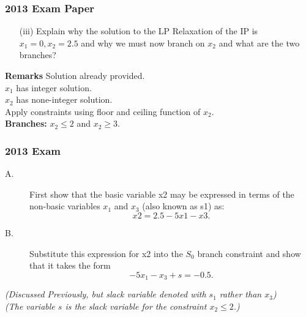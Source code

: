 \documentclass{beamer}
\begin{document}
\begin{frame}
\frametitle{2013 Exam Paper}
\large
\begin{itemize}
\item[(iii)] Explain why the solution to the LP Relaxation of the IP is $x_1 = 0, x_2 = 2.5$ and why we must now branch on $x_2$ and what are the
two branches? 
\end{itemize}
\bigskip
\noindent  \textbf{Remarks}
Solution already provided.\\
$x_1$ has integer solution.\\
$x_2$ has none-integer solution. \\ Apply constraints using floor and ceiling function of $x_2$.\\
\bigskip 
\textbf{Branches:}  $x_2 \leq 2$ and $x_2 \geq 3$.\\
\end{frame}

\begin{frame}
\frametitle{2013 Exam}
	\large
	\begin{description}
		\item[A.] First show that the basic variable x2 may be expressed in
		terms of the non-basic variables $x_1$ and $x_3$ (also known as s1) as:
		\[x2 = 2.5 - 5x1 - x3. \]
		\item[B.] Substitute this expression for x2 into the $S_0$ branch constraint
		and show that it takes the form \[-5x_1 - x_3 + s = -0.5.\] 
	\end{description}
\textit{(Discussed Previously, but slack variable denoted with $s_1$ rather than $x_3$)}\\ \bigskip
%
\textit{(The
variable $s$ is the slack variable for the constraint $x_2 \leq 2$.) }
\end{frame}
\end{document}
